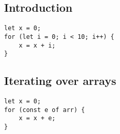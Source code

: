 
\subsection{Introduction}

\begin{verbatim}
let x = 0;
for (let i = 0; i < 10; i++) {
    x = x + i;
}
\end{verbatim}

\subsection{Iterating over arrays}

\begin{verbatim}
let x = 0;
for (const e of arr) {
    x = x + e;
}
\end{verbatim}

